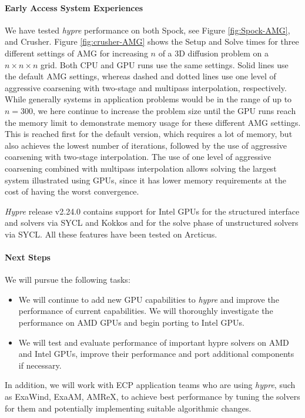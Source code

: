 \paragraph{Early Access System Experiences}

We have tested {\sl hypre} performance on both Spock, see Figure \ref{fig:Spock-AMG}, and Crusher.  Figure \ref{fig:crusher-AMG} 
shows the Setup and Solve times for three different settings of AMG for increasing $n$ of a 3D diffusion problem on a $n \times n \times n$ grid. Both CPU and GPU runs use the same settings. Solid lines use the default AMG settings, whereas dashed and dotted lines use one level of aggressive coarsening with two-stage and multipass interpolation, respectively. While generally systems in application problems would be in the range of up to $n=300$, we here continue to increase the problem size until the GPU runs reach the memory limit to demonstrate memory usage for these different AMG settings. This is reached first for the default version, which requires a lot of memory, but also achieves the lowest number of iterations, followed by the use of aggressive coarsening with two-stage interpolation. The use of one level of aggressive coarsening combined with multipass interpolation allows solving the largest system illustrated using GPUs, since it has lower memory requirements at the cost of having the worst convergence.  

{\sl Hypre} release v2.24.0 contains support for Intel GPUs for the structured interface and solvers via SYCL and Kokkos and for the solve phase of unstructured solvers via SYCL. All these features have been tested on Arcticus.

\paragraph{Next Steps}

We will pursue the following tasks:

\begin{itemize}
\item We will continue to add new GPU capabilities to {\sl hypre} and improve the performance of current capabilities. We will thoroughly investigate the performance on AMD GPUs and begin porting to Intel GPUs.
\item We will test and evaluate performance of important hypre solvers on AMD and Intel GPUs, improve their performance and port additional components if necessary.
\end{itemize}
In addition, we will work with ECP application teams who are using {\sl hypre}, such as ExaWind, ExaAM, AMReX,  to achieve best performance by tuning the solvers for them and potentially implementing suitable algorithmic changes.
